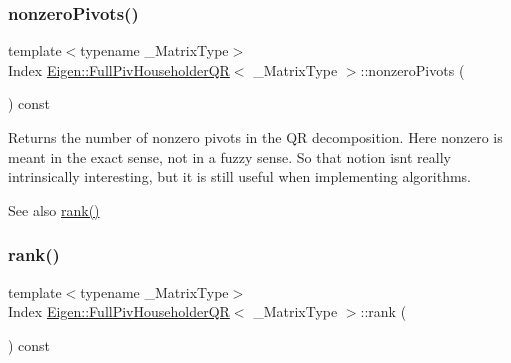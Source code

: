 \subsubsection{\texorpdfstring{nonzeroPivots()}{nonzeroPivots()}}
{\footnotesize\ttfamily template$<$typename \+\_\+\+Matrix\+Type$>$ \\
Index \mbox{\hyperlink{class_eigen_1_1_full_piv_householder_q_r}{Eigen\+::\+Full\+Piv\+Householder\+QR}}$<$ \+\_\+\+Matrix\+Type $>$\+::nonzero\+Pivots (\begin{DoxyParamCaption}{ }\end{DoxyParamCaption}) const\hspace{0.3cm}{\ttfamily [inline]}}

\begin{DoxyReturn}{Returns}
the number of nonzero pivots in the QR decomposition. Here nonzero is meant in the exact sense, not in a fuzzy sense. So that notion isn\textquotesingle{}t really intrinsically interesting, but it is still useful when implementing algorithms.
\end{DoxyReturn}
\begin{DoxySeeAlso}{See also}
\mbox{\hyperlink{class_eigen_1_1_full_piv_householder_q_r_aeae555220f46477818ccc94aca2de770}{rank()}} 
\end{DoxySeeAlso}
\mbox{\label{class_eigen_1_1_full_piv_householder_q_r_aeae555220f46477818ccc94aca2de770}} 
\subsubsection{\texorpdfstring{rank()}{rank()}}
{\footnotesize\ttfamily template$<$typename \+\_\+\+Matrix\+Type$>$ \\
Index \mbox{\hyperlink{class_eigen_1_1_full_piv_householder_q_r}{Eigen\+::\+Full\+Piv\+Householder\+QR}}$<$ \+\_\+\+Matrix\+Type $>$\+::rank (\begin{DoxyParamCaption}{ }\end{DoxyParamCaption}) const\hspace{0.3cm}{\ttfamily [inline]}}

